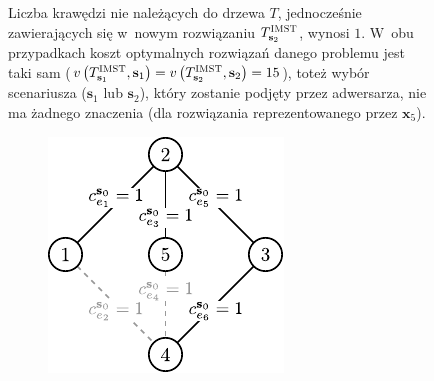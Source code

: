 \begin{figure}[!htbp]
{		Liczba krawędzi nie należących do drzewa $T$, jednocześnie zawierających się w~nowym rozwiązaniu $T^{\textsc{IMST}}_{\textbf{s}_{2}}$, wynosi $1$.
		W~obu przypadkach koszt optymalnych rozwiązań danego problemu jest taki sam ($v \left(  T^{\textsc{IMST}}_{\textbf{s}_{1}}, \textbf{s}_{1} \right) = v \left(  T^{\textsc{IMST}}_{\textbf{s}_{2}}, \textbf{s}_{2} \right) = 15$), toteż wybór scenariusza ($\textbf{s}_{1}$ lub $\textbf{s}_{2}$), który zostanie podjęty przez adwersarza, nie ma żadnego znaczenia (dla rozwiązania reprezentowanego przez $\textbf{x}_{5}$).
	}
\end{figure}

\begin{figure}[!htbp]
	\null\hfill
	\ContinuedFloat
	\begin{subfigure}[b]{0.3\textwidth}
		\includegraphics[width=\textwidth]{Chapter_II/ROB-INC-MST-example/a2}
		\caption{}
		\label{fig:robincrexample:d}
	\end{subfigure}
	\hfill
	\begin{subfigure}[b]{0.3\textwidth}

\end{subfigure}
\end{figure}
